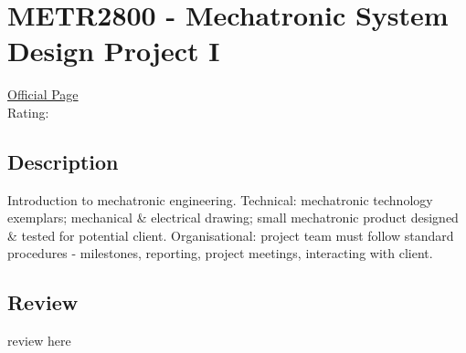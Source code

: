 \hypertarget{METR2800}{\section{METR2800 - Mechatronic System Design Project I}}

\large
\textcolor{turbo_purple}{\href{https://my.uq.edu.au/programs-courses/course.html?course_code=METR2800}{Official Page}} \\
Rating: \cstar\cstar\cstar\cstar\ostar

\normalsize
\subsection*{Description}
Introduction to mechatronic engineering.
Technical: mechatronic technology exemplars; mechanical \& electrical drawing; small mechatronic product designed \& tested for potential client.
Organisational: project team must follow standard procedures - milestones, reporting, project meetings, interacting with client.

\subsection*{Review}
review here
